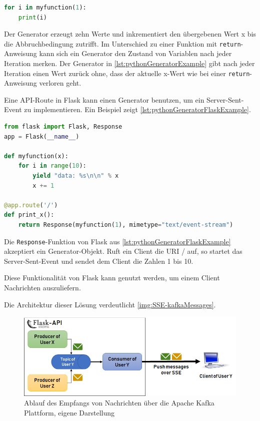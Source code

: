 \documentclass[a4paper,titlepage,halfparskip,12pt]{scrreprt}
\begin{document}
\begin{onehalfspacing}
\begin{lstlisting}[language=python, caption={Beispiel: Code für ein Generator Objekt in Python}, label={lst:pythonGeneratorExample}]
for i in myfunction(1):
    print(i)
\end{lstlisting}

Der Generator erzeugt zehn Werte und inkrementiert den übergebenen Wert x bis die Abbruchbedingung zutrifft. Im Unterschied zu einer Funktion mit \texttt{return}-Anweisung kann sich ein Generator den Zustand von Variablen nach jeder Iteration merken. Der Generator in \autoref{lst:pythonGeneratorExample} gibt nach jeder Iteration einen Wert zurück ohne, dass der aktuelle x-Wert wie bei einer \texttt{return}-Anweisung verloren geht.

Eine \acs{API}-Route in Flask kann einen Generator benutzen, um ein Server-Sent-Event zu implementieren. Ein Beispiel zeigt \autoref{lst:pythonGeneratorFlaskExample}.

\begin{lstlisting}[language=python, caption={Beispiel: Code für ein Server-Sent-Event in Python Flask}, label={lst:pythonGeneratorFlaskExample}]
from flask import Flask, Response
app = Flask(__name__)

def myfunction(x):
    for i in range(10):
        yield "data: %s\n\n" % x
        x += 1

@app.route('/')
def print_x():
    return Response(myfunction(1), mimetype="text/event-stream")
\end{lstlisting}

Die \texttt{Response}-Funktion von Flask aus \autoref{lst:pythonGeneratorFlaskExample} akzeptiert ein Generator-Objekt. Ruft ein Client die  \acs{URI} / auf, so startet das Server-Sent-Event und sendet dem Client die Zahlen 1 bis 10.

Diese Funktionalität von Flask kann genutzt werden, um einem Client Nachrichten auszuliefern.

Die Architektur dieser Lösung verdeutlicht \autoref{img:SSE-kafkaMessages}.

\begin{figure}[h]
	\centering
	\includegraphics[width=.9\textwidth]{images/SSE-kafkaMessages}
	\caption{Ablauf des Empfangs von Nachrichten über die Apache Kafka Plattform, eigene Darstellung}
	\label{img:SSE-kafkaMessages}
\end{figure}


\end{onehalfspacing}
\end{document}
